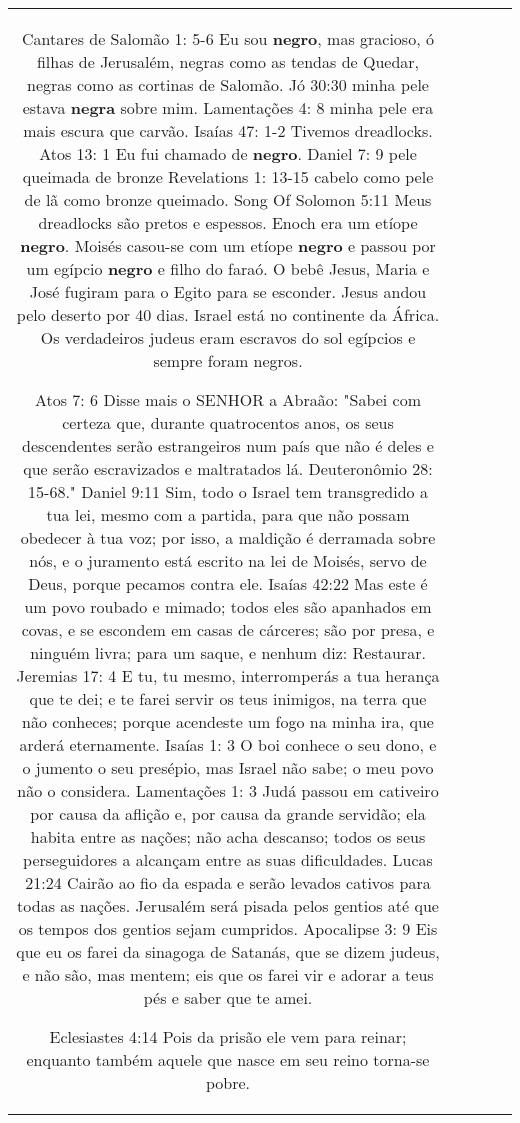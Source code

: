 \documentclass[11pt]{article}
\newlength\mylength
\begin{document}
\begin{center}
\begin{longtable}{|C{.65\mylength}|C{.30\mylength}|C{.12\mylength}|C{.12\mylength}|C{.12\mylength}|}
Cantares de Salomão 1: 5-6 Eu sou \textbf{negro}, mas gracioso, ó filhas de Jerusalém, negras como as tendas de Quedar, negras como as cortinas de Salomão. Jó 30:30 minha pele estava \textbf{negra} sobre mim. Lamentações 4: 8 minha pele era mais escura que carvão. Isaías 47: 1-2 Tivemos dreadlocks. Atos 13: 1 Eu fui chamado de \textbf{negro}. Daniel 7: 9 pele queimada de bronze Revelations 1: 13-15 cabelo como pele de lã como bronze queimado. Song Of Solomon 5:11 Meus dreadlocks são pretos e espessos. Enoch era um etíope \textbf{negro}. Moisés casou-se com um etíope \textbf{negro} e passou por um egípcio \textbf{negro} e filho do faraó. O bebê Jesus, Maria e José fugiram para o Egito para se esconder. Jesus andou pelo deserto por 40 dias. Israel está no continente da África. Os verdadeiros judeus eram escravos do sol egípcios e sempre foram negros.

Atos 7: 6 Disse mais o SENHOR a Abraão: "Sabei com certeza que, durante quatrocentos anos, os seus descendentes serão estrangeiros num país que não é deles e que serão escravizados e maltratados lá. Deuteronômio 28: 15-68."
Daniel 9:11 Sim, todo o Israel tem transgredido a tua lei, mesmo com a partida, para que não possam obedecer à tua voz; por isso, a maldição é derramada sobre nós, e o juramento está escrito na lei de Moisés, servo de Deus, porque pecamos contra ele. Isaías 42:22 Mas este é um povo roubado e mimado; todos eles são apanhados em covas, e se escondem em casas de cárceres; são por presa, e ninguém livra; para um saque, e nenhum diz: Restaurar.
Jeremias 17: 4 E tu, tu mesmo, interromperás a tua herança que te dei; e te farei servir os teus inimigos, na terra que não conheces; porque acendeste um fogo na minha ira, que arderá eternamente.
Isaías 1: 3 O boi conhece o seu dono, e o jumento o seu presépio, mas Israel não sabe; o meu povo não o considera.
Lamentações 1: 3 Judá passou em cativeiro por causa da aflição e, por causa da grande servidão; ela habita entre as nações; não acha descanso; todos os seus perseguidores a alcançam entre as suas dificuldades.
Lucas 21:24 Cairão ao fio da espada e serão levados cativos para todas as nações. Jerusalém será pisada pelos gentios até que os tempos dos gentios sejam cumpridos.
Apocalipse 3: 9 Eis que eu os farei da sinagoga de Satanás, que se dizem judeus, e não são, mas mentem; eis que os farei vir e adorar a teus pés e saber que te amei.

Eclesiastes 4:14 Pois da prisão ele vem para reinar; enquanto também aquele que nasce em seu reino torna-se pobre.


\end{longtable}
\end{center}
\end{document}
